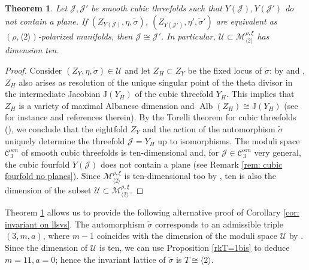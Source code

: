 \documentclass{amsart}
\newtheorem{theorem}{Theorem}[section]
\theoremstyle{definition}
\DeclareMathOperator{\alb}{Alb}
\begin{document}
\begin{theorem} \label{thm: llsvs maximal family}
Let $\mathcal{J},\mathcal{J}'$ be smooth cubic threefolds such that $Y(\mathcal{J}), Y(\mathcal{J'})$ do not contain a plane. If $(Z_{Y(\mathcal{J})}, \eta, \tilde{\sigma})$, $(Z_{Y(\mathcal{J}')}, \eta', \tilde{\sigma}')$ are equivalent as $(\rho, \langle 2 \rangle)$-polarized manifolds, then $\mathcal{J} \cong \mathcal{J}'$. In particular, $\mathcal{U} \subset \mathcal{M}^{\rho, \xi}_{\langle 2 \rangle}$ has dimension ten.
\end{theorem}

\begin{proof}
Consider $(Z_Y, \eta, \tilde{\sigma}) \in \mathcal{U}$ and let $Z_H \subset Z_Y$ be the fixed locus of $\tilde{\sigma}$: by \cite[Theorem 3.3]{shinder_soldatenkov} and \cite[\S 6.3]{iliev}, $Z_H$ also arises as resolution of the unique singular point of the theta divisor in the intermediate Jacobian $\textrm{J}(Y_H)$ of the cubic threefold $Y_H$. This implies that $Z_H$ is a variety of maximal Albanese dimension and \mbox{$\alb(Z_H) \cong \textrm{J}(Y_H)$} (see for instance \cite[\S 1]{maximal_albanese} and references therein). By the Torelli theorem for cubic threefolds (\cite[Theorem 13.11]{clemens_griffiths}), we conclude that the eightfold $Z_Y$ and the action of the automorphism $\tilde{\sigma}$ uniquely determine the threefold $\mathcal{J} = Y_H$ up to isomorphisms. The moduli space $\mathcal{C}^{\textit{sm}}_3$ of smooth cubic threefolds is ten-dimensional and, for $\mathcal{J} \in \mathcal{C}^{\textit{sm}}_3$ very general, the cubic fourfold $Y(\mathcal{J})$ does not contain a plane (see Remark \ref{rem: cubic fourfold no planes}). Since $\mathcal{M}^{\rho, \xi}_{\langle 2 \rangle}$ is ten-dimensional too by \cite[Corollary 6.5]{bcs_ballq}, ten is also the dimension of the subset $\mathcal{U} \subset \mathcal{M}^{\rho, \xi}_{\langle 2 \rangle}$.
\end{proof}

Theorem \ref{thm: llsvs maximal family} allows us to provide the following alternative proof of Corollary \ref{cor: invariant on llsvs}. The automorphism $\tilde{\sigma}$ corresponds to an admissible triple $(3, m ,a)$, where $m-1$ coincides with the dimension of the moduli space $\mathcal{U}$ by \cite[\S 4]{bcs}. Since the dimension of $\mathcal{U}$ is ten, we can  use Proposition \ref{rkT=1bis} to deduce $m = 11, a = 0$; hence the invariant lattice of $\tilde{\sigma}$ is $T \cong \langle 2 \rangle$. 

\clearpage
\end{document}
